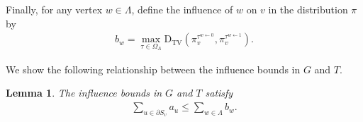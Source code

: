 \documentclass[11pt]{amsart}
\def\-#1{\mathrm{#1}}
\newcommand{\DTV}[2]{\-D_{\mathrm{TV}}\left({#1},{#2}\right)}
\newcommand{\nbd}[2]{N_{#1}^{#2}}
\newtheorem{lemma}[theorem]{Lemma}
\theoremstyle{definition}
\theoremstyle{remark}
\begin{document}


Finally, for any vertex $w \in \Lambda$, define the influence of $w$ on $v$ in the distribution $\pi$ by
\begin{align}\label{eq:b-w}
    b_w = \max_{\tau \in \Omega_{\Lambda}} \DTV{\pi^{\tau^{w \gets 0}}_v}{\pi^{\tau^{w \gets 1}}_v}.
\end{align}

We show the following relationship between the influence bounds in $G$ and $T$.

\begin{lemma}\label{lemma:mapping-influence-bounds}
The influence bounds in $G$ and $T$ satisfy
\begin{align*}
\sum_{u \in \partial S_v} a_u \leq \sum_{w \in \Lambda} b_w.
\end{align*}
\end{lemma}
\end{document}
